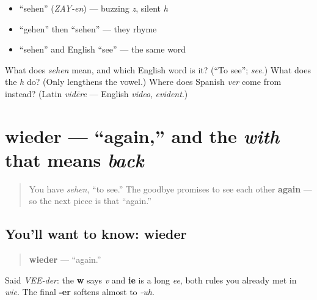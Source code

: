 \begin{itemize}
\raggedright
  \item \textquotedblleft{}sehen\textquotedblright{} (\emph{ZAY-en}) — buzzing \emph{z}, silent \emph{h}
  \item \textquotedblleft{}gehen\textquotedblright{} then \textquotedblleft{}sehen\textquotedblright{} — they rhyme
  \item \textquotedblleft{}sehen\textquotedblright{} and English \textquotedblleft{}see\textquotedblright{} — the same word
\end{itemize}

\begin{tcolorbox}[breakable,colback=teal!4,colframe=teal!35!black,title={Before you move on}]
What does \emph{sehen} mean, and which English word is it? (\textquotedblleft{}To see\textquotedblright{}; \emph{see}.) What does the \emph{h} do? (Only lengthens the vowel.) Where does Spanish \emph{ver} come from instead? (Latin \emph{vidēre} — English \emph{video}, \emph{evident}.)
\end{tcolorbox}
\section[wieder]{wieder — \textquotedblleft{}again,\textquotedblright{} and the \emph{with} that means \emph{back}}

\label{lesson:GE-C04-wieder}



\begin{quote}
You have \emph{sehen}, \textquotedblleft{}to see.\textquotedblright{} The goodbye promises to see each other \textbf{again} — so the next piece is that \textquotedblleft{}again.\textquotedblright{}
\end{quote}

\subsection*{You'll want to know: wieder}
\begin{quote}
\textbf{wieder} — \textquotedblleft{}again.\textquotedblright{}
\end{quote}

Said \emph{VEE-der}: the \textbf{w} says \emph{v} and \textbf{ie} is a long \emph{ee}, both rules you already met in \emph{wie}. The final \textbf{-er} softens almost to \emph{-uh}.

